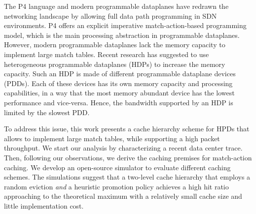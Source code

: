 The P4 language and modern programmable dataplanes have redrawn the networking landscape by allowing full data path programming in SDN environments.
P4 offers an explicit imperative match-action-based programming model, which is the main processing abstraction in programmable dataplanes.
However, modern programmable dataplanes lack the memory capacity to implement large match tables.
Recent research has suggested to use heterogeneous programmable dataplanes (HDPs) to increase the memory capacity. 
Such an HDP is made of different programmable dataplane devices (PDDs).
Each of these devices has its own memory capacity and processing capabilities, in a way that the most memory abundant device has the lowest performance and vice-versa.
Hence, the bandwidth supported by an HDP is limited by the slowest PDD.

To address this issue, this work presents a cache hierarchy scheme for HPDs that allows to implement large match tables, while supporting a high packet throughput. 
We start our analysis by characterizing a recent data center trace.
Then, following our observations, we derive the caching premises for match-action caching.
We develop an open-source simulator to evaluate different caching schemes.
The simulations suggest that a two-level cache hierarchy that employs a random eviction \textit{and} a heuristic promotion policy achieves a high hit ratio approaching to the theoretical maximum with a relatively small cache size and little implementation cost.
